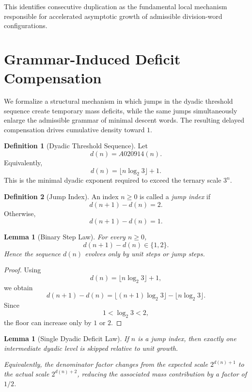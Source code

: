 \documentclass[12pt, oneside]{article}
\numberwithin{equation}{section}
\theoremstyle{definition}
\newtheorem{definition}{Definition}[section]
\theoremstyle{plain}
\newtheorem{lemma}[theorem]{Lemma}
\theoremstyle{remark}
\begin{document}
This identifies consecutive duplication as the fundamental local
mechanism responsible for accelerated asymptotic growth of admissible
division-word configurations.

\section{Grammar-Induced Deficit Compensation}
\label{sec:grammar-compensation}

We formalize a structural mechanism in which jumps in the dyadic
threshold sequence create temporary mass deficits, while the same jumps
simultaneously enlarge the admissible grammar of minimal descent words.
The resulting delayed compensation drives cumulative density toward $1$.


\begin{definition}[Dyadic Threshold Sequence]
Let
\[
d(n)=A020914(n).
\]
Equivalently,
\[
d(n)=\lfloor n\log_2 3 \rfloor + 1.
\]
This is the minimal dyadic exponent required to exceed the ternary scale
$3^n$.
\end{definition}


\begin{definition}[Jump Index]
An index $n\ge0$ is called a \emph{jump index} if
\[
d(n+1)-d(n)=2.
\]
Otherwise,
\[
d(n+1)-d(n)=1.
\]
\end{definition}


\begin{lemma}[Binary Step Law]
\label{lem:binary-step}
For every $n\ge0$,
\[
d(n+1)-d(n)\in\{1,2\}.
\]
Hence the sequence $d(n)$ evolves only by unit steps or jump steps.
\end{lemma}

\begin{proof}
Using
\[
d(n)=\lfloor n\log_2 3\rfloor+1,
\]
we obtain
\[
d(n+1)-d(n)
=
\lfloor (n+1)\log_2 3\rfloor-\lfloor n\log_2 3\rfloor.
\]
Since
\[
1<\log_2 3<2,
\]
the floor can increase only by $1$ or $2$.
\end{proof}


\begin{lemma}[Single Dyadic Deficit Law]
\label{lem:deficit-law}
If $n$ is a jump index, then exactly one intermediate dyadic level is
skipped relative to unit growth.

Equivalently, the denominator factor changes from the expected scale
$2^{d(n)+1}$ to the actual scale $2^{d(n)+2}$, reducing the associated
mass contribution by a factor of $1/2$.
\end{lemma}
\end{document}
